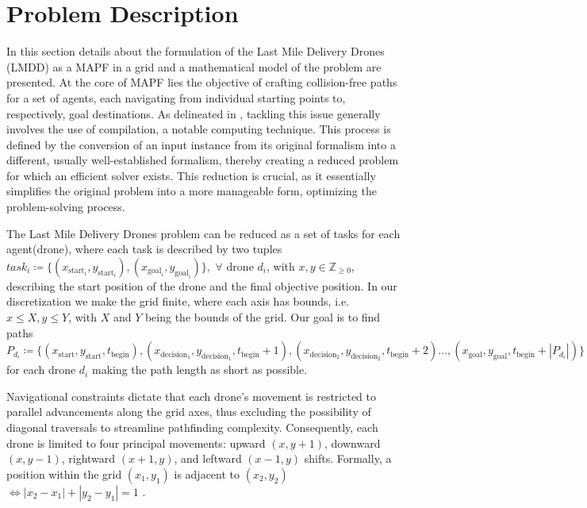 \chapter[Problem Description]{Problem Description}
\label{ProblemDescription}


In this section details about the formulation of the Last Mile Delivery Drones (LMDD) as a MAPF in a grid and a mathematical model of the problem are presented. At the core of MAPF lies the objective of crafting collision-free paths for a set of agents, each navigating from individual starting points to, respectively, goal destinations. As delineated in , tackling this issue generally involves the use of compilation, a notable computing technique. This process is defined by the conversion of an input instance from its original formalism into a different, usually well-established formalism, thereby creating a reduced problem for which an efficient solver exists. This reduction is crucial, as it essentially simplifies the original problem into a more manageable form, optimizing the problem-solving process.

 The Last Mile Delivery Drones problem can be reduced as a set of tasks for each agent(drone), where each task is described by two tuples  $task_i \coloneq \{(x_{\text{start}_i}, y_{\text{start}_i}) , (x_{\text{goal}_i}, y_{\text{goal}_i})\} ,$ $\forall $ drone $d_i$, with $x,y \in \mathbb{Z}_{\geq 0} $, describing the start position of the drone and the final objective position. In our discretization we make the grid finite, where each axis has bounds, i.e. $x \leq X, y \leq Y$, with $X$ and $Y$ being the bounds of the grid. Our goal is to find paths $P_{d_{i}} \coloneq \{(x_{\text{start}}, y_{\text{start}}, t_{\text{begin}} ), (x_{\text{decision}_1}, y_{\text{decision}_1}, t_{\text{begin}}+1),(x_{\text{decision}_2}, y_{\text{decision}_2}, t_{\text{begin}}+2) \dots,  (x_{\text{goal}}, y_{\text{goal}} , t_{\text{begin}} + | P_{d_i} | ) \} $ for each drone $d_i$ making the path length as short as possible.

Navigational constraints dictate that each drone's movement is restricted to parallel advancements along the grid axes, thus excluding the possibility of diagonal traversals to streamline pathfinding complexity. Consequently, each drone is limited to four principal movements: upward $(x, y+1)$, downward $(x, y-1)$, rightward $(x+1, y)$, and leftward $(x-1, y)$ shifts. Formally, a position within the grid $(x_1,y_1)$ is adjacent to $(x_2,y_2)$  $\iff |x_2-x_1| + |y_2-y_1| = 1$ . 

